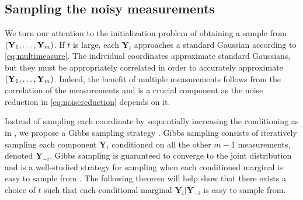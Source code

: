 
\subsection{Sampling the noisy measurements}
We turn our attention to the initialization problem of obtaining a sample from  $\mathopen{}\left(\mathbf{Y}_1, \dots, \mathbf{Y}_m\right)$. If $t$ is large, each $\mathbf{Y}_i$ approaches a standard Gaussian according to \eqref{eq:multimeasure}. The individual coordinates approximate standard Gaussians, but they must be appropriately correlated in order to accurately approximate $\mathopen{}\left(\mathbf{Y}_1, \dots, \mathbf{Y}_m\right)$. Indeed, the benefit of multiple measurements follows from the correlation of the measurements and is a crucial component as the noise reduction in \eqref{eq:noisereduction} depends on it. 

Instead of sampling each coordinate by sequentially increasing the conditioning as in \cite{saremi_chain_2023}, we propose a Gibbs sampling strategy \cite{casella_explaining_1992, roberts_updating_1997}. Gibbs sampling consists of iteratively sampling each component $\mathbf{Y}_i$ conditioned on all the other $m-1$ measurements, denoted $\mathbf{Y}_{-i}$. Gibbs sampling is guaranteed to converge to the joint distribution \cite{rosenthal_minorization_1995} and is a well-studied strategy for sampling when each conditioned marginal is easy to sample from \cite{koller_probabilistic_2009}. The following theorem will help show that there exists a choice of $t$ such that each conditional marginal $\mathbf{Y}_i|\mathbf{Y}_{-i}$ is easy to sample from. 

